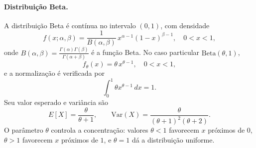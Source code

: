\paragraph{Distribuição Beta.}
A distribuição Beta é contínua no intervalo $(0,1)$, com densidade
\[
f(x;\alpha,\beta)
= \frac{1}{B(\alpha,\beta)}\, x^{\alpha-1}(1-x)^{\beta-1},
\quad
0<x<1,
\]
onde $B(\alpha,\beta)=\frac{\Gamma(\alpha)\Gamma(\beta)}{\Gamma(\alpha+\beta)}$ é a função Beta.
No caso particular $\mathrm{Beta}(\theta,1)$,
\[
f_\theta(x)=\theta\,x^{\theta-1},\quad 0<x<1,
\]
e a normalização é verificada por
\[
\int_0^1 \theta x^{\theta-1}\,dx = 1.
\]
Seu valor esperado e variância são
\[
E[X]=\frac{\theta}{\theta+1},
\qquad
\mathrm{Var}(X)=\frac{\theta}{(\theta+1)^2(\theta+2)}.
\]
O parâmetro $\theta$ controla a concentração:
valores $\theta<1$ favorecem $x$ próximos de $0$,
$\theta>1$ favorecem $x$ próximos de $1$,
e $\theta=1$ dá a distribuição uniforme.